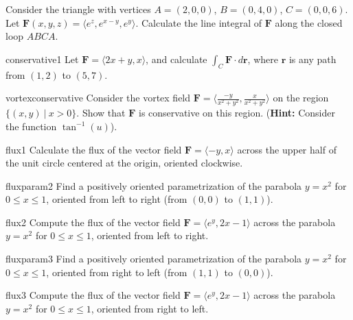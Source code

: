 \begin{problem}
    Consider the triangle with vertices $A = (2,0,0)$, $B = (0,4,0)$, $C = (0,0,6)$.  Let $\bm{F}(x,y,z) = \langle e^z, e^{x-y}, e^y \rangle$.  Calculate the line integral of $\bm{F}$ along the closed loop $ABCA$.
\end{problem}

\begin{problem}{conservative1}
Let $\bm{F} = \langle 2x+y, x \rangle$, and calculate $\int_C \bm{F} \cdot d\bm{r}$, where $\bm{r}$ is any path from $(1,2)$ to $(5,7)$.
\end{problem}

\begin{problem}{vortexconservative}
    Consider the vortex field $\bm{F} = \langle \frac{-y}{x^2 + y^2}, \frac{x}{x^2 + y^2} \rangle$ on the region $\{(x,y) \ | \ x > 0\}$. Show that $\bm{F}$ is conservative on this region.  (\textbf{Hint:} Consider the function $\tan^{-1}(u)$).
\end{problem}

\begin{problem}{flux1}
     Calculate the flux of the vector field $\bm{F} = \langle -y, x \rangle$ across the upper half of the unit circle centered at the origin, oriented clockwise.
\end{problem}

\begin{problem}{fluxparam2}
    Find a positively oriented parametrization of the parabola $y = x^2$ for $0 \leq x \leq 1$, oriented from left to right (from $(0,0)$ to $(1,1)$). 
\end{problem}

\begin{problem}{flux2}
    Compute the flux of the vector field $\bm{F} = \langle e^y, 2x-1 \rangle$ across the parabola $y = x^2$ for $0 \leq x \leq 1$, oriented from left to right.
\end{problem}

\begin{problem}{fluxparam3}
    Find a positively oriented parametrization of the parabola $y = x^2$ for $0 \leq x \leq 1$, oriented from right to left (from $(1,1)$ to $(0,0)$). 
\end{problem}

\begin{problem}{flux3}
    Compute the flux of the vector field $\bm{F} = \langle e^y, 2x-1 \rangle$ across the parabola $y = x^2$ for $0 \leq x \leq 1$, oriented from right to left.
\end{problem}


